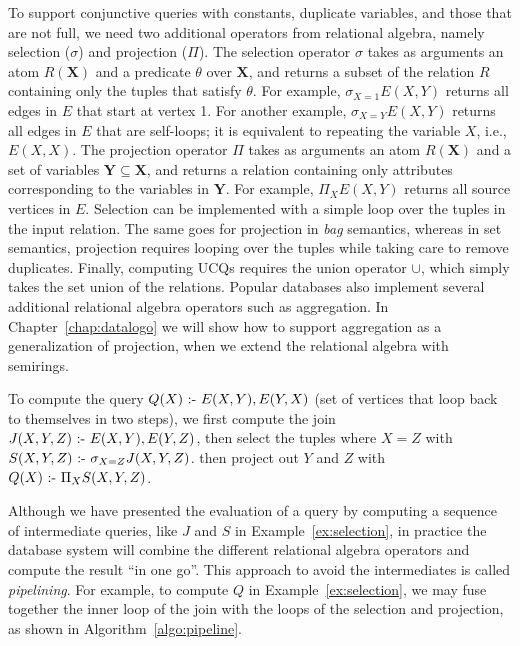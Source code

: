 To support conjunctive queries with constants, 
 duplicate variables, and those that are not full,
 we need two additional operators from relational algebra, 
 namely selection ($\sigma$) and projection ($\Pi$).
The selection operator $\sigma$ takes as arguments an atom $R({\bm X})$
 and a predicate $\theta$ over ${\bm X}$,
 and returns a subset of the relation $R$ containing only the tuples that satisfy $\theta$.
For example, $\sigma_{X = 1}E(X, Y)$ returns all edges in $E$ that start at vertex 1.
For another example, $\sigma_{X = Y}E(X, Y)$ returns all edges in $E$ that are self-loops;
 it is equivalent to repeating the variable $X$, i.e., $E(X, X)$.
The projection operator $\Pi$ takes as arguments an atom $R({\bm X})$
 and a set of variables ${\bm Y} \subseteq {\bm X}$,
 and returns a relation containing only attributes corresponding 
 to the variables in ${\bm Y}$.
For example, $\Pi_{X}E(X, Y)$ returns all source vertices in $E$.
Selection can be implemented with a simple loop over the tuples in the input relation.
The same goes for projection in {\em bag} semantics, 
 whereas in set semantics, projection requires looping over the tuples while taking care to remove duplicates.
Finally, computing UCQs requires the union operator $\cup$,
 which simply takes the set union of the relations.
Popular databases also implement several additional relational algebra operators 
 such as aggregation.
In Chapter~\ref{chap:datalogo} we will show how to support aggregation
 as a generalization of projection, 
 when we extend the relational algebra with semirings.

\begin{ex}
\label{ex:selection}
To compute the query $Q(X) \text{ :- } E(X, Y), E(Y, X)$ 
 (set of vertices that loop back to themselves in two steps),
 we first compute the join $J(X, Y, Z) \text{ :- } E(X, Y), E(Y, Z)$, 
 then select the tuples where $X = Z$ with $S(X, Y, Z) \text{ :- } \sigma_{X=Z} J(X, Y, Z)$.
 then project out $Y$ and $Z$ with $Q(X) \text{ :- } \Pi_{X} S(X, Y, Z)$.
\end{ex}
 
Although we have presented the evaluation of a query 
 by computing a sequence of intermediate queries, 
 like $J$ and $S$ in Example~\ref{ex:selection},
 in practice the database system will combine
 the different relational algebra operators 
 and compute the result ``in one go''.
This approach to avoid the intermediates 
 is called {\em pipelining}.
For example, to compute $Q$ in Example~\ref{ex:selection},
 we may fuse together the inner loop of the join
 with the loops of the selection and projection, 
 as shown in Algorithm~\ref{algo:pipeline}.

